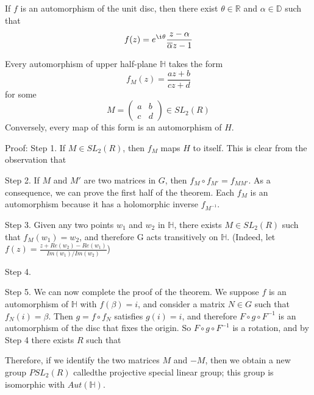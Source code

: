 \documentclass[12pt, oneside]{book}
\begin{document}
\begin{theorem}
    If $f$ is an automorphism of the unit disc, then there exist  $\theta \in\mathbb{R}$ and $\alpha \in \mathbb{D}$ such that
    \begin{equation*}
        f(z)
        =
        e^{\i \theta}\frac{z-\alpha}{\overline{\alpha}z - 1}
    \end{equation*}
\end{theorem}

\begin{theorem}
    Every automorphism of upper half-plane $\mathbb{H}$ takes the form
    \begin{equation*}
        f_M(z)=\frac{az+b}{cz+d}
    \end{equation*}
    for some
    \begin{equation*}
        M=
        \left(\begin{matrix}
            a & b \\
            c & d
        \end{matrix}\right)\in SL_2(R)
    \end{equation*}
    Conversely, every map of this form is an automorphism of $H$.

    Proof: Step 1. If $M\in SL_2(R)$, then $f_M$ maps $H$ to itself. This is clear from the observation that

    Step 2. If $M$ and $M'$ are two matrices in $G$, then $f_M\circ f_{M'} = f_{MM'}$. As a consequence, we can prove the first half of the theorem. Each $f_M$ is an
    automorphism because it has a holomorphic inverse $f_{M^{-1}}$.

    Step 3. Given any two points $w_1$ and $w_2$ in $\mathbb{H}$, there exists $M\in SL_2(R)$ such that $f_M(w_1) = w_2$, and therefore G acts transitively on $\mathbb{H}$. (Indeed, let $f(z)=\frac{z+Re(w_2)-Re(w_1)}{Im(w_1)/Im(w_2)}$)

    Step 4.

    Step 5. We can now complete the proof of the theorem. We suppose $f$ is an automorphism of $\mathbb{H}$ with $f(\beta) = i$, and consider a matrix $N\in G$ such that $f_N (i) =\beta$. Then $g=f\circ f_N$ satisfies $g(i) = i$, and therefore $F\circ g\circ F^{-1}$ is an automorphism of the disc that fixes the origin. So $F\circ g\circ F^{-1}$ is a rotation, and by Step 4 there exists  $R$ such that



    Therefore, if we identify the two matrices $M$ and $-M$, then we obtain a new group $PSL_2(R)$ calledthe projective special linear group; this group is isomorphic with $Aut(\mathbb{H})$.
\end{theorem}
\end{document}
